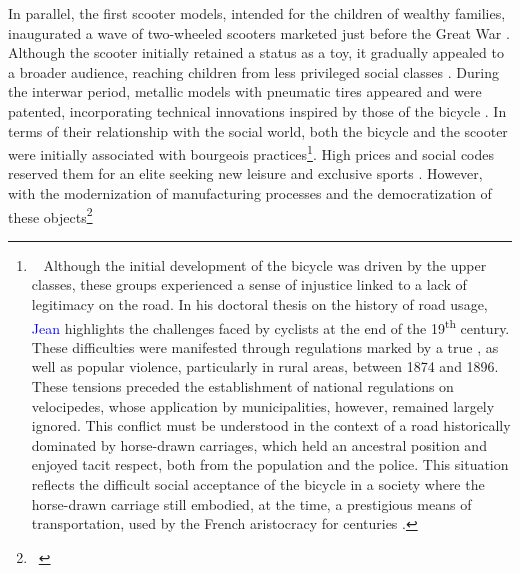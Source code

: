 \begin{refsegment}
In parallel, the first scooter models, intended for the children of wealthy families, inaugurated a wave of two-wheeled scooters marketed just before the Great War \textcolor{blue}{\autocite{jeux_et_compagnie_histoire_2013}}. Although the scooter initially retained a status as a toy, it gradually appealed to a broader audience, reaching children from less privileged social classes \textcolor{blue}{\autocite{historia_trottinette_2013}}. During the interwar period, metallic models with pneumatic tires appeared and were patented, incorporating technical innovations inspired by those of the bicycle \textcolor{blue}{\autocite{arte_histoire_2014}}. In terms of their relationship with the social world, both the bicycle and the scooter were initially associated with bourgeois practices\footnote{~
    Although the initial development of the bicycle was driven by the upper classes, these groups experienced a sense of injustice linked to a lack of legitimacy on the road. In his doctoral thesis on the history of road usage, \textcolor{blue}{Jean} \textcolor{blue}{\textcite[126-132, 327]{orselli_usages_2008}} highlights the challenges faced by cyclists at the end of the 19\textsuperscript{th} century. These difficulties were manifested through regulations marked by a true , as well as popular violence, particularly in rural areas, between 1874 and 1896. These tensions preceded the establishment of national regulations on velocipedes, whose application by municipalities, however, remained largely ignored. This conflict must be understood in the context of a road historically dominated by horse-drawn carriages, which held an ancestral position and enjoyed tacit respect, both from the population and the police. This situation reflects the difficult social acceptance of the bicycle in a society where the horse-drawn carriage still embodied, at the time, a prestigious means of transportation, used by the French aristocracy for centuries \textcolor{blue}{\autocite[139]{orselli_usages_2008}}.
}. High prices and social codes reserved them for an elite seeking new leisure and exclusive sports \textcolor{blue}{\autocite[90]{bravard_cercle_2011}}. However, with the modernization of manufacturing processes and the democratization of these objects\footnote{~
}
\end{refsegment}
